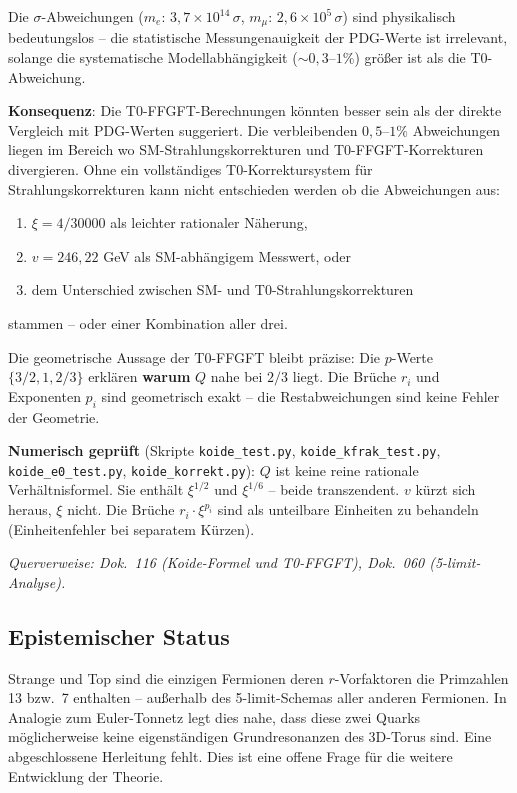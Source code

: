 Die $\sigma$-Abweichungen ($m_e$: $3{,}7 \times 10^{14}\,\sigma$,
$m_\mu$: $2{,}6 \times 10^5\,\sigma$) sind physikalisch bedeutungslos
-- die statistische Messungenauigkeit der PDG-Werte ist irrelevant,
solange die systematische Modellabhängigkeit ($\sim 0{,}3$--$1\%$)
größer ist als die T0-Abweichung.

\textbf{Konsequenz}: Die T0-FFGFT-Berechnungen könnten besser sein
als der direkte Vergleich mit PDG-Werten suggeriert. Die verbleibenden
$0{,}5$--$1\%$ Abweichungen liegen im Bereich wo SM-Strahlungs\-korrekturen
und T0-FFGFT-Korrekturen divergieren. Ohne ein vollständiges
T0-Korrektursystem für Strahlungskorrekturen kann nicht entschieden
werden ob die Abweichungen aus:
\begin{enumerate}
    \item $\xi = 4/30000$ als leichter rationaler Näherung,
    \item $v = 246{,}22$ GeV als SM-abhängigem Messwert, oder
    \item dem Unterschied zwischen SM- und T0-Strahlungskorrekturen
\end{enumerate}
stammen -- oder einer Kombination aller drei.

Die geometrische Aussage der T0-FFGFT bleibt präzise:
Die $p$-Werte $\{3/2, 1, 2/3\}$ erklären \textbf{warum} $Q$ nahe
bei $2/3$ liegt. Die Brüche $r_i$ und Exponenten $p_i$ sind
geometrisch exakt -- die Restabweichungen sind keine Fehler der
Geometrie.

\textbf{Numerisch geprüft} (Skripte \texttt{koide\_test.py},
\texttt{koide\_kfrak\_test.py}, \texttt{koide\_e0\_test.py},
\texttt{koide\_korrekt.py}):
$Q$ ist keine reine rationale Verhältnisformel. Sie enthält
$\xi^{1/2}$ und $\xi^{1/6}$ -- beide transzendent. $v$ kürzt sich
heraus, $\xi$ nicht. Die Brüche $r_i \cdot \xi^{p_i}$ sind als
unteilbare Einheiten zu behandeln (Einheitenfehler bei separatem Kürzen).

\noindent\textit{Querverweise: Dok.~116 (Koide-Formel und T0-FFGFT),
Dok.~060 (5-limit-Analyse).}

\subsection{Epistemischer Status}

\begin{predbox}
Strange und Top sind die einzigen Fermionen deren $r$-Vorfaktoren
die Primzahlen 13 bzw.\ 7 enthalten -- außerhalb des 5-limit-Schemas
aller anderen Fermionen. In Analogie zum Euler-Tonnetz legt dies
nahe, dass diese zwei Quarks möglicherweise keine eigenständigen
Grundresonanzen des 3D-Torus sind. Eine abgeschlossene Herleitung
fehlt. Dies ist eine offene Frage für die weitere Entwicklung der
Theorie.
\end{predbox}

